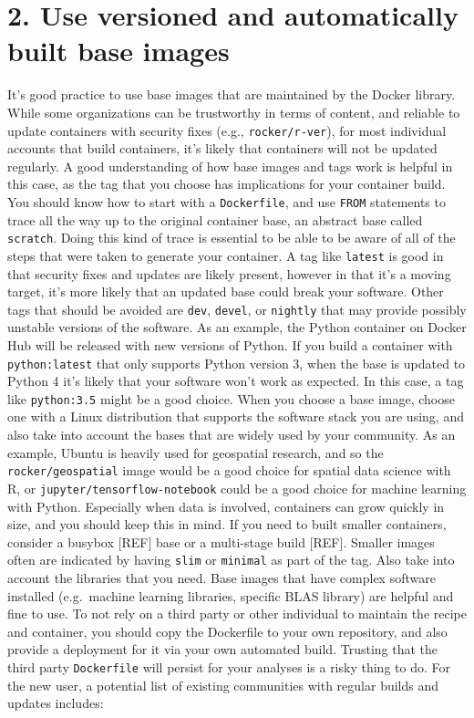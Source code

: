 \documentclass[10pt,letterpaper]{article}
\begin{document}
\hypertarget{use-versioned-and-automatically-built-base-images}{%
\section*{2. Use versioned and automatically built base
images}\label{use-versioned-and-automatically-built-base-images}}

It's good practice to use base images that are maintained by the Docker
library. While some organizations can be trustworthy in terms of
content, and reliable to update containers with security fixes (e.g.,
\texttt{rocker/r-ver}), for most individual accounts that build
containers, it's likely that containers will not be updated regularly. A
good understanding of how base images and tags work is helpful in this
case, as the tag that you choose has implications for your container
build. You should know how to start with a \texttt{Dockerfile}, and use
\texttt{FROM} statements to trace all the way up to the original
container base, an abstract base called \texttt{scratch}. Doing this
kind of trace is essential to be able to be aware of all of the steps
that were taken to generate your container. A tag like \texttt{latest}
is good in that security fixes and updates are likely present, however
in that it's a moving target, it's more likely that an updated base
could break your software. Other tags that should be avoided are
\texttt{dev}, \texttt{devel}, or \texttt{nightly} that may provide
possibly unstable versions of the software. As an example, the Python
container on Docker Hub will be released with new versions of Python. If
you build a container with \texttt{python:latest} that only supports
Python version 3, when the base is updated to Python 4 it's likely that
your software won't work as expected. In this case, a tag like
\texttt{python:3.5} might be a good choice. When you choose a base
image, choose one with a Linux distribution that supports the software
stack you are using, and also take into account the bases that are
widely used by your community. As an example, Ubuntu is heavily used for
geospatial research, and so the \texttt{rocker/geospatial} image would
be a good choice for spatial data science with R, or
\texttt{jupyter/tensorflow-notebook} could be a good choice for machine
learning with Python. Especially when data is involved, containers can
grow quickly in size, and you should keep this in mind. If you need to
built smaller containers, consider a busybox {[}REF{]} base or a
multi-stage build {[}REF{]}. Smaller images often are indicated by
having \texttt{slim} or \texttt{minimal} as part of the tag. Also take
into account the libraries that you need. Base images that have complex
software installed (e.g.~machine learning libraries, specific BLAS
library) are helpful and fine to use. To not rely on a third party or
other individual to maintain the recipe and container, you should copy
the Dockerfile to your own repository, and also provide a deployment for
it via your own automated build. Trusting that the third party
\texttt{Dockerfile} will persist for your analyses is a risky thing to
do. For the new user, a potential list of existing communities with
regular builds and updates includes:
\end{document}
